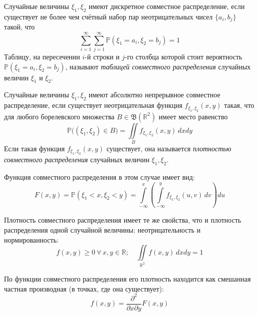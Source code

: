 \begin{defn}
    Случайные величины $\xi_1, \xi_2$ имеют дискретное совместное распределение, если существует не более чем счётный набор пар неотрицательных чисел $\{a_{i}, b_{j}\}$ такой, что
    \begin{equation*}
        \sum\limits_{i=1}^{\infty} \sum\limits_{j=1}^{\infty} \mathbb{P}\left(\xi_{1}=a_{i}, \xi_{2}=b_{j}\right)=1
    \end{equation*}
    Таблицу, на пересечении $i$-й строки и $j$-го столбца которой стоит вероятность $\mathbb{P}\left(\xi_{1}=a_{i}, \xi_{2}=b_{j}\right)$, называют \textit{таблицей совместного распределения} случайных величин $\xi_1$ и $\xi_2$.
\end{defn}
\begin{defn}
    Случайные величины $\xi_1, \xi_2$ имеют абсолютно непрерывное совместное распределение, если существует неотрицательная функция $f_{\xi_{1}, \xi_{2}}(x, y)$ такая, что для любого борелевского множества $B \in \mathfrak{B}\left(\mathbb{R}^{2}\right)$ имеет место равенство
    \begin{equation*}
        \mathbb{P}\bigl(\left(\xi_{1}, \xi_{2}\right) \in B\bigr)=\iint\limits_{B} f_{\xi_{1}, \xi_{2}}(x, y) \, d x d y
    \end{equation*}
    Если такая функция $f_{\xi_{1}, \xi_{2}}(x, y)$ существует, она называется \textit{плотностью совместного распределения} случайных величин $\xi_1, \xi_2$.
    
    Функция совместного распределения в этом случае имеет вид:
    \begin{equation*}
        F(x, y)=\mathbb{P}(\xi_{1}<x, \xi_{2}<y)=\int\limits_{-\infty}^{x}\left(\int\limits_{-\infty}^{y} f_{\xi_{1}, \xi_{2}}(u, v) \, d v\right) d u
    \end{equation*}
\end{defn}

\begin{rmrk}
    Плотность совместного распределения имеет те же свойства, что и плотность распределения одной случайной величины: неотрицательность и нормированность:
    \begin{equation*}
        f(x, y) \geqslant 0~ \forall \, x,y \in \mathbb{R}; \quad \iint\limits_{\mathbb{R}^{2}} f(x, y) \, dx dy = 1
    \end{equation*}

    По функции совместного распределения его плотность находится как смешанная частная производная (в точках, где она существует):
    \begin{equation*}
        f(x, y)=\frac{\partial^{2}}{\partial x \partial y} F(x, y)
    \end{equation*}
\end{rmrk}

